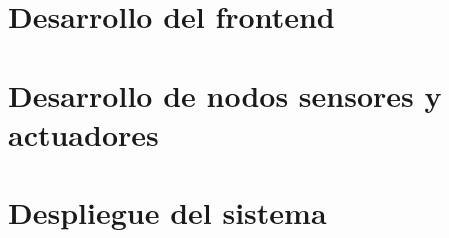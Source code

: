 
\section{Desarrollo del frontend}


\section{Desarrollo de nodos sensores y actuadores}


\section{Despliegue del sistema}

